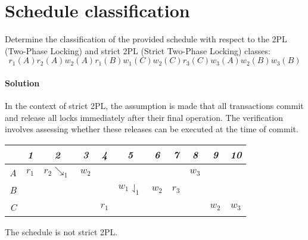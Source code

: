 \section{Schedule classification}

Determine the classification of the provided schedule with respect to the 2PL (Two-Phase Locking) and strict 2PL (Strict Two-Phase Locking) classes:
\[r_1(A) r_2(A) w_2(A) r_1(B) w_1(C) w_2(C) r_3(C) w_3(A) w_2(B) w_3(B)\]

\paragraph*{Solution}
In the context of strict 2PL, the assumption is made that all transactions commit and release all locks immediately after their final operation. 
The verification involves assessing whether these releases can be executed at the time of commit.
\begin{table}[H]
    \centering
    \begin{tabular}{c|cccccccccc}
            & \textit{1} & \textit{2} & \textit{3} & \textit{4} & \textit{5} & \textit{6} & \textit{7} & \textit{8} & \textit{9} & \textit{10} \\ \hline
    \textit{A} & $r_1$      & $r_2\searrow _1$          & $w_2$      &            &            &            &            & $w_3$      &            &             \\
    \textit{B} &            &                           &            &            & $w_1\downharpoonleft_1$      & $w_2$      & $r_3$      &            &            &             \\
    \textit{C} &            &                           &            & $r_1$      &            &            &            &            & $w_2$      & $w_3$      
    \end{tabular}%
\end{table}
The schedule is not strict 2PL.

